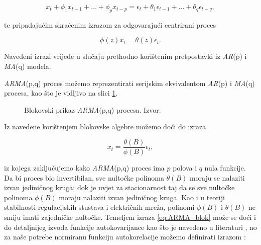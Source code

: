\documentclass[a4paper,12pt,oneside]{memoir}
\begin{document}
            \begin{equation}
                x_t+\phi_1x_{t-1}+\ldots+\phi_px_{t-p}=\epsilon_t+\theta_1\epsilon_{t-1}+\ldots+\theta_q\epsilon_{t-q},
            \end{equation}

            te pripadajućim skraćenim izrazom za odgovarajući centrirani proces

            \begin{equation}
                \phi(z)x_t=\theta(z)\epsilon_t.
            \end{equation}

            Navedeni izrazi vrijede u slučaju prethodno korištenim pretpostavki iz \textit{AR}(p) i \textit{MA}(q) modela.

            \textit{ARMA}(p,q) proces možemo reprezentirati serijskim ekvivalentom \textit{AR}(p) i \textit{MA}(q) procesa, kao što je vidljivo na slici \ref{fig:ARMA_blok}.

            \begin{figure}[H]
                \centering
                \caption{Blokovski prikaz \textit{ARMA}(p,q) procesa. Izvor: \cite{Broersen}}
                \label{fig:ARMA_blok}
            \end{figure}
            
            Iz navedene korištenjem blokovske algebre možemo doći do izraza

            \begin{equation}
                x_t=\frac{\theta(B)}{\phi(B)}\epsilon_t,
                \label{eq:ARMA_blok}
            \end{equation}

            iz kojega zaključujemo kako \textit{ARMA}(p,q) proces ima $p$ polova i $q$ nula funkcije. Da bi proces bio invertibilan, sve nultočke polinoma $\theta(B)$ moraju se nalaziti izvan jediničnog kruga; dok je uvjet za stacionarnost taj da se sve nultočke polinoma $\phi(B)$ moraju nalaziti izvan jediničnog kruga. Kao i u teoriji stabilnosti regulacijskih stustava i električnih mreža, polinomi $\phi(B)$ i $\theta(B)$ ne smiju imati zajedničke nultočke. Temeljem izraza \eqref{eq:ARMA_blok} može se doći i do detaljnijeg izvoda funkcije autokovarijance kao što je navedeno u literaturi \cite{Broersen}, no za naše potrebe normiranu funkciju autokorelacije možemo definirati izrazom \cite{Bahovec}:
\end{document}
